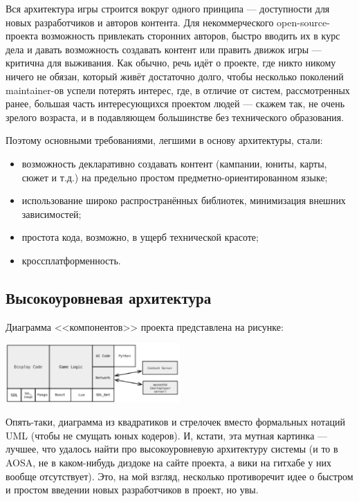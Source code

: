\documentclass[a5paper]{article}
\begin{document}
Вся архитектура игры строится вокруг одного принципа --- доступности для новых разработчиков и авторов контента. Для некоммерческого open-source-проекта возможность привлекать сторонних авторов, быстро вводить их в курс дела и давать возможность создавать контент или править движок игры --- критична для выживания. Как обычно, речь идёт о проекте, где никто никому ничего не обязан, который живёт достаточно долго, чтобы несколько поколений maintainer-ов успели потерять интерес, где, в отличие от систем, рассмотренных ранее, большая часть интересующихся проектом людей --- скажем так, не очень зрелого возраста, и в подавляющем большинстве без технического образования.

Поэтому основными требованиями, легшими в основу архитектуры, стали:
\begin{itemize}
    \item возможность декларативно создавать контент (кампании, юниты, карты, сюжет и т.д.) на предельно простом предметно-ориентированном языке;
    \item использование широко распространённых библиотек, минимизация внешних зависимостей;
    \item простота кода, возможно, в ущерб технической красоте;
    \item кроссплатформенность.
\end{itemize}

\subsection{Высокоуровневая архитектура}

Диаграмма <<компонентов>> проекта представлена на рисунке:

\begin{center}
    \includegraphics[width=0.5\textwidth]{wesnothArchitecture.png}
\end{center}

Опять-таки, диаграмма из квадратиков и стрелочек вместо формальных нотаций UML (чтобы не смущать юных кодеров). И, кстати, эта мутная картинка --- лучшее, что удалось найти про высокоуровневую архитектуру системы (и то в AOSA, не в каком-нибудь диздоке на сайте проекта, а вики на гитхабе у них вообще отсутствует). Это, на мой взгляд, несколько противоречит идее о быстром и простом введении новых разработчиков в проект, но увы.
\end{document}
